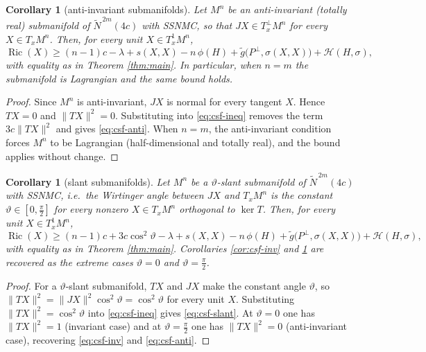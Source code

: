 \documentclass[11pt]{article}
\newtheorem{corollary}[theorem]{Corollary}
\theoremstyle{definition}
\newcommand{\tN}{\widetilde{N}}
\newcommand{\tg}{\widetilde{g}}
\newcommand{\Ric}{\operatorname{Ric}}
\newcommand{\HH}{\mathcal{H}}
\begin{document}
\begin{corollary}[anti-invariant submanifolds]\label{cor:csf-anti}
Let $M^n$ be an anti-invariant (totally real) submanifold of $\tN^{\,2m}(4c)$ with SSNMC, so that $JX\in T^\perp_xM^n$ for every $X\in T_xM^n$. Then, for every unit $X\in T^1_xM^n$,
\begin{equation}\label{eq:csf-anti}
\Ric(X)\ge(n-1)c-\lambda+s(X,X)-n\,\phi(H)+\tg\bigl(P^\perp,\sigma(X,X)\bigr)+\HH(H,\sigma),
\end{equation}
with equality as in Theorem \ref{thm:main}. In particular, when $n=m$ the submanifold is Lagrangian and the same bound holds.
\end{corollary}
\begin{proof}
Since $M^n$ is anti-invariant, $JX$ is normal for every tangent $X$. Hence $TX=0$ and $\|TX\|^2=0$. Substituting into \eqref{eq:csf-ineq} removes the term $3c\|TX\|^2$ and gives \eqref{eq:csf-anti}. When $n=m$, the anti-invariant condition forces $M^n$ to be Lagrangian (half-dimensional and totally real), and the bound applies without change.
\end{proof}

\begin{corollary}[slant submanifolds]\label{cor:csf-slant}
Let $M^n$ be a $\vartheta$-slant submanifold of $\tN^{\,2m}(4c)$ with SSNMC, i.e.\ the Wirtinger angle between $JX$ and $T_xM^n$ is the constant $\vartheta\in[0,\tfrac\pi2]$ for every nonzero $X\in T_xM^n$ orthogonal to $\ker T$. Then, for every unit $X\in T^1_xM^n$,
\begin{equation}\label{eq:csf-slant}
\Ric(X)\ge(n-1)c+3c\cos^2\vartheta-\lambda+s(X,X)-n\,\phi(H)+\tg\bigl(P^\perp,\sigma(X,X)\bigr)+\HH(H,\sigma),
\end{equation}
with equality as in Theorem \ref{thm:main}. Corollaries \ref{cor:csf-inv} and \ref{cor:csf-anti} are recovered as the extreme cases $\vartheta=0$ and $\vartheta=\tfrac\pi2$.
\end{corollary}
\begin{proof}
For a $\vartheta$-slant submanifold, $TX$ and $JX$ make the constant angle $\vartheta$, so $\|TX\|^2=\|JX\|^2\cos^2\vartheta=\cos^2\vartheta$ for every unit $X$. Substituting $\|TX\|^2=\cos^2\vartheta$ into \eqref{eq:csf-ineq} gives \eqref{eq:csf-slant}. At $\vartheta=0$ one has $\|TX\|^2=1$ (invariant case) and at $\vartheta=\tfrac\pi2$ one has $\|TX\|^2=0$ (anti-invariant case), recovering \eqref{eq:csf-inv} and \eqref{eq:csf-anti}.
\end{proof}
\end{document}
